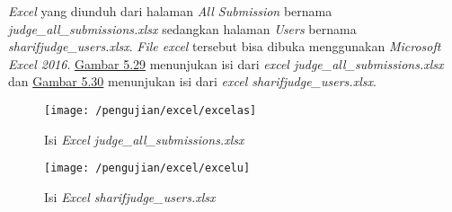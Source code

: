 	\textit{Excel} yang diunduh dari halaman \textit{All Submission} bernama \textit{judge\_all\_submissions.xlsx} sedangkan halaman \textit{Users} bernama \textit{sharifjudge\_users.xlsx}. \textit{File excel} tersebut bisa dibuka menggunakan \textit{Microsoft Excel 2016}. \hyperref[fig:excelas]{Gambar 5.29} menunjukan isi dari \textit{excel judge\_all\_submissions.xlsx} dan \hyperref[fig:excelu]{Gambar 5.30} menunjukan isi dari \textit{excel sharifjudge\_users.xlsx}.
	\begin{figure}[H]
		\centering  
		\texttt{[image: /pengujian/excel/excelas]}  
		\caption[Isi \textit{Excel judge\_all\_submissions.xlsx}]{Isi \textit{Excel judge\_all\_submissions.xlsx}} 
		\label{fig:excelas} 
	\end{figure}

	\begin{figure}[H]
		\centering  
		\texttt{[image: /pengujian/excel/excelu]}  
		\caption[Isi \textit{Excel sharifjudge\_users.xlsx}]{Isi \textit{Excel sharifjudge\_users.xlsx}} 
		\label{fig:excelu} 
	\end{figure}
	
	